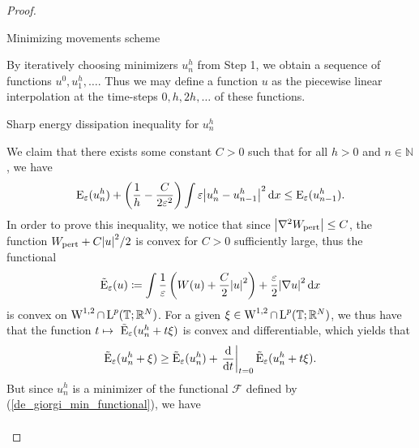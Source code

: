 \begin{proof}
\begin{description}[wide=0pt]
		\item[Step 2:] Minimizing movements scheme 
		
		By iteratively choosing minimizers $ u_{ n }^{ h } $ from Step 1, we 
		obtain a sequence of functions $ u^{ 0 }, u_{ 1 }^{ h } 
		, \dotsc $. Thus we may define a function $ u  $ as the piecewise 
		linear interpolation at the time-steps $ 0, h , 2h, \dotsc $ of these 
		functions.
		
		\item[Step 3:] Sharp energy dissipation inequality for $ u_{ n }^{ h } $
		
		We claim that there exists some constant $ C > 0 $ such that for all $ h > 0 $ and $ n \in \mathbb{ N } $, we have
		\begin{equation}
			\label{discrete_optimal_energy_dissipation}
			\operatorname{E}_{ \varepsilon } ( u_{ n }^{ h } )
			+
			\left( \frac{ 1 }{ h } - \frac{ C }{ 2 \varepsilon^{ 2 } } \right)
			\int \varepsilon \abs{ u_{ n }^{ h } - u_{ n - 1 }^{ h } }^{ 2 } \dd{ x }
			\leq
			\operatorname{E}_{ \varepsilon } ( u_{ n - 1 }^{ h } ).
		\end{equation}
		In order to prove this inequality, we notice that since $ \abs{ \nabla^{ 2 } W_{ \mathrm{pert} } } \leq C $, the function $ W_{ \mathrm{pert} } + C \abs{ u }^{ 2 }/2 $ is convex for $ C > 0 $ sufficiently large, thus the functional 
		\begin{equation*}
			\tilde{\operatorname{E}}_{ \varepsilon }  ( u )
			\coloneqq
			\int 
			\frac{ 1 }{ \varepsilon }
			\left( W ( u ) + \frac{ C }{ 2 } \abs{ u }^{ 2 } \right)
			+
			\frac{ \varepsilon}{ 2 }
			\abs{ \nabla u }^{ 2 }
			\dd{ x }
		\end{equation*}
		is convex on $ \operatorname{W}^{ 1 , 2 } \cap \operatorname{L}^{ p } ( \operatorname{\mathbb{T}} ; \mathbb{ R }^{ N } ) $. For a given $ \xi \in \operatorname{W}^{ 1 , 2 } \cap \operatorname{L}^{ p } ( \operatorname{\mathbb{T}} ; \mathbb{ R }^{ N } ) $, we thus have that the function
		$ t \mapsto \ \tilde{\operatorname{E}}_{ \varepsilon } ( u_{ n }^{ h } + t \xi ) $ is convex and differentiable, which yields that
		\begin{equation}
			\label{convexity_at_time_1}
			\tilde{\operatorname{E}}_{ \varepsilon } ( u_{ n }^{ h } + \xi )
			\geq
			\tilde{\operatorname{E}}_{ \varepsilon } ( u_{ n }^{ h } ) + 
			\left.\dv{ t }\right|_{ t = 0 } \tilde{\operatorname{E}}_{ \varepsilon } ( u_{ n }^{ h } + t \xi).
		\end{equation} 
		But since $ u_{ n }^{ h } $ is a minimizer of the functional $\mathcal{ 
		F }$ defined by (\ref{de_giorgi_min_functional}), we have
		\begin{align*}

\end{align*}
\end{description}
\end{proof}
